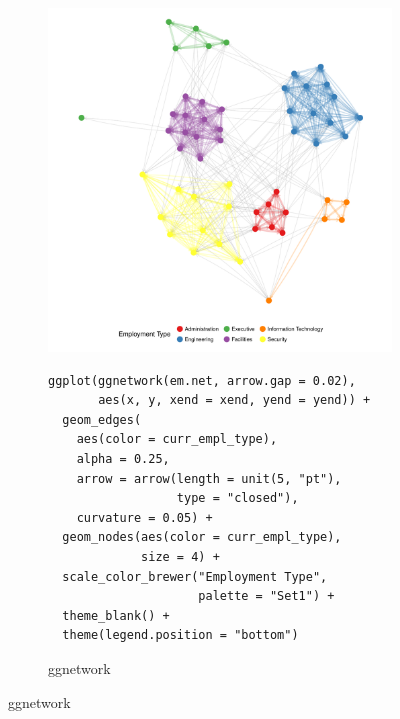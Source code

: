 \begin{figure}[hbt]
\begin{subfigure}[t]{\textwidth}
\begin{adjustbox}{valign=t}
\begin{minipage}{.49\textwidth}
                   \end{minipage}

                  \begin{minipage}{.49\textwidth}

\includegraphics[width=\textwidth]{figure/email_geom_net-1.pdf}

                          \end{minipage}

                          \end{adjustbox}
\end{subfigure}
%
\begin{subfigure}[t]{\textwidth}
\caption{ggnetwork}
\vspace{1em}

             \begin{adjustbox}{valign=t}

             \begin{minipage}{.49\textwidth}
 \begin{knitrout}\footnotesize
{}\color{fgcolor}\begin{kframe}
\begin{verbatim}
ggplot(ggnetwork(em.net, arrow.gap = 0.02),
       aes(x, y, xend = xend, yend = yend)) +
  geom_edges(
    aes(color = curr_empl_type),
    alpha = 0.25,
    arrow = arrow(length = unit(5, "pt"),
                  type = "closed"),
    curvature = 0.05) +
  geom_nodes(aes(color = curr_empl_type),
             size = 4) +
  scale_color_brewer("Employment Type",
                     palette = "Set1") +
  theme_blank() +
  theme(legend.position = "bottom")
\end{verbatim}
\end{kframe}
\end{knitrout} \vspace{1em}


\end{minipage}
\end{adjustbox}
\end{subfigure}
\end{figure}
